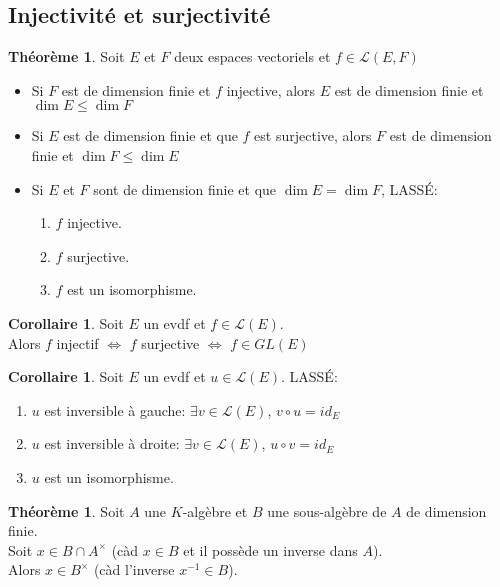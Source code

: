 \documentclass[10pt,a4paper]{article}
\theoremstyle{definition}
\newtheorem{theorem}[proposition]{Théorème}
\newtheorem{corollaire}[proposition]{Corollaire}
\begin{document}
\subsection{Injectivité et surjectivité}
\begin{theorem}
Soit $E$ et $F$ deux espaces vectoriels et $f \in \mathcal{L}(E, F)$
\begin{itemize}
\item Si $F$ est de dimension finie et $f$ injective, alors $E$ est de dimension finie et $\dim E \leq \dim F$
\item Si $E$ est de dimension finie et que $f$ est surjective, alors $F$ est de dimension finie et $\dim F \leq \dim E$
\item Si $E$ et $F$ sont de dimension finie et que $\dim E = \dim F$, LASSÉ:
\begin{enumerate}
\item $f$ injective.
\item $f$ surjective.
\item $f$ est un isomorphisme.
\end{enumerate}
\end{itemize}
\end{theorem}
\begin{corollaire}
Soit $E$ un evdf et $f \in \mathcal{L}(E)$. \\
Alors $f$ injectif $\iff$ $f$ surjective $\iff$ $f \in GL(E)$
\end{corollaire}
\begin{corollaire}
Soit $E$ un evdf et $u \in \mathcal{L}(E)$. LASSÉ:
\begin{enumerate}
\item $u$ est inversible à gauche: $\exists v \in \mathcal{L}(E)$, $v \circ u = id_E$
\item $u$ est inversible à droite: $\exists v \in \mathcal{L}(E)$, $u \circ v = id_E$
\item $u$ est un isomorphisme.
\end{enumerate}
\end{corollaire}
\begin{theorem}
Soit $A$ une $K$-algèbre et $B$ une sous-algèbre de $A$ de dimension finie. \\
Soit $x \in B \cap A^\times$ (càd $x\in B$ et il possède un inverse dans $A$). \\
Alors $x \in B^\times$ (càd l'inverse $x^{-1} \in B$).
\end{theorem}
\end{document}
